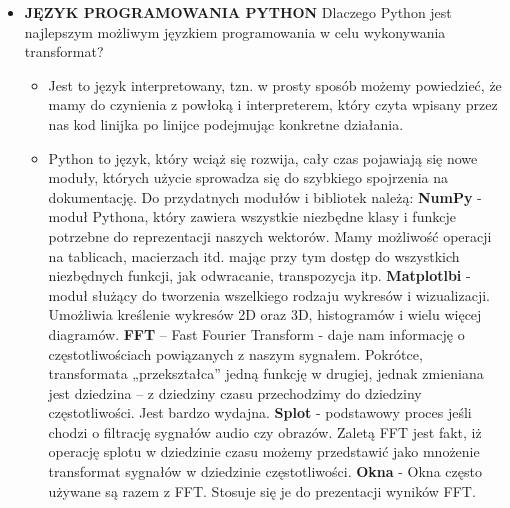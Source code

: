 \documentclass[a4paper,titleauthor]{mwart}
\begin{document}
\begin{itemize}
		\item \textbf{JĘZYK PROGRAMOWANIA PYTHON} \newline\newline
		Dlaczego Python jest najlepszym możliwym jęyzkiem programowania w celu wykonywania transformat?\newline
		\begin{itemize}
			\item Jest to język interpretowany, tzn. w prosty sposób możemy powiedzieć, że mamy do czynienia z powłoką i interpreterem, który czyta wpisany przez nas kod linijka po linijce podejmując konkretne działania.\newline
			\item Python to język, który wciąż się rozwija, cały czas pojawiają się nowe moduły, których użycie sprowadza się do szybkiego spojrzenia na dokumentację.\newline\newline
			Do przydatnych modułów i bibliotek należą:\newline\newline
			\textbf{NumPy} - moduł Pythona, który zawiera wszystkie niezbędne klasy i funkcje potrzebne do reprezentacji naszych wektorów. Mamy możliwość operacji na tablicach, macierzach itd. mając przy tym dostęp do wszystkich niezbędnych funkcji, jak odwracanie, transpozycja itp.\newline\newline
			\textbf{Matplotlbi} - moduł służący do tworzenia wszelkiego rodzaju wykresów i wizualizacji. Umożliwia kreślenie wykresów 2D oraz 3D, histogramów i wielu więcej diagramów.\newline\newline
			\textbf{FFT} – Fast Fourier Transform - daje nam informację o częstotliwościach powiązanych z naszym sygnałem. Pokrótce, transformata „przekształca” jedną funkcję w drugiej, jednak zmieniana jest dziedzina – z dziedziny czasu przechodzimy do dziedziny częstotliwości. Jest bardzo wydajna.\newline\newline
			\textbf{Splot} - podstawowy proces jeśli chodzi o filtrację sygnałów audio czy obrazów. Zaletą FFT jest fakt, iż operację splotu w dziedzinie czasu możemy przedstawić jako mnożenie transformat sygnałów w dziedzinie częstotliwości.\newline\newline
			\textbf{Okna} - Okna często używane są razem z FFT. Stosuje się je do prezentacji wyników FFT.\newline\newline
		\end{itemize}
		

\end{itemize}
\end{document}
